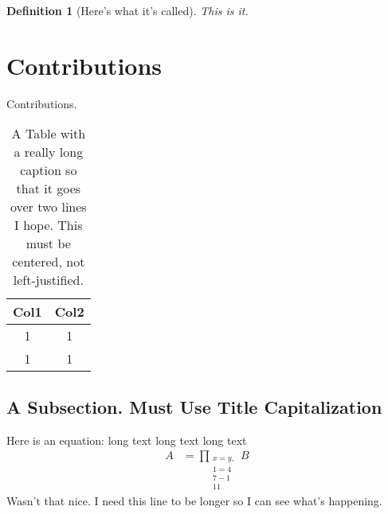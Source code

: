 \documentclass[12pt]{report} %
\numberwithin{equation}{subsection}
\numberwithin{figure}{chapter} %
\theoremstyle{numbernote}
\theoremstyle{nonumber}
\newtheorem*{definition*}{Definition}
\theoremstyle{nonumbernonote}
\theoremstyle{nonote}
\begin{document}
\lipsum[1]

\begin{definition*}[Here's what it's called]
    This is it.
\end{definition*}

\lipsum[1]


\section{Contributions}

Contributions. \lipsum[1]

\begin{table}[!htbp]
    \caption[An example of a long caption]{A Table with a really long caption so that it goes over two lines I hope. This must be centered, not left-justified.}
    \label{tab:my_label}
    \centering
    \begin{tabular}{c|c}
        \hline
        Col1 & Col2\\
        \hline
        1 & 1 \\
        1 & 1 \\
        \hline
    \end{tabular}
\end{table}

\lipsum[1]
\subsection{A Subsection. Must Use Title Capitalization}


\lipsum[1]

Here is an equation: long text long text long text
\begin{align*}
    A &= \prod_{\substack{x = y,\\ 1 = 4\\ 7 - 1\\ 11}} B
\end{align*}
Wasn't that nice. I need this line to be longer so I can see what's happening.
\end{document}
